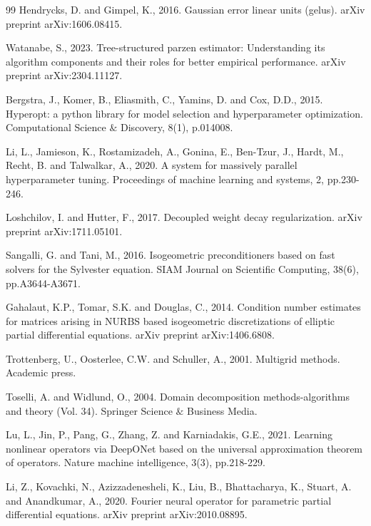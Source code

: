 \documentclass{article}
\theoremstyle{plain}
\numberwithin{equation}{section}
\begin{document}
\begin{thebibliography}{99}
    Hendrycks, D. and Gimpel, K., 2016. Gaussian error linear units (gelus). arXiv preprint arXiv:1606.08415.

    Watanabe, S., 2023. Tree-structured parzen estimator: Understanding its algorithm components and their roles for better empirical performance. arXiv preprint arXiv:2304.11127.

    Bergstra, J., Komer, B., Eliasmith, C., Yamins, D. and Cox, D.D., 2015. Hyperopt: a python library for model selection and hyperparameter optimization. Computational Science $\&$ Discovery, 8(1), p.014008.

    Li, L., Jamieson, K., Rostamizadeh, A., Gonina, E., Ben-Tzur, J., Hardt, M., Recht, B. and Talwalkar, A., 2020. A system for massively parallel hyperparameter tuning. Proceedings of machine learning and systems, 2, pp.230-246.

    Loshchilov, I. and Hutter, F., 2017. Decoupled weight decay regularization. arXiv preprint arXiv:1711.05101.

    Sangalli, G. and Tani, M., 2016. Isogeometric preconditioners based on fast solvers for the Sylvester equation. SIAM Journal on Scientific Computing, 38(6), pp.A3644-A3671.

    Gahalaut, K.P., Tomar, S.K. and Douglas, C., 2014. Condition number estimates for matrices arising in NURBS based isogeometric discretizations of elliptic partial differential equations. arXiv preprint arXiv:1406.6808.

    Trottenberg, U., Oosterlee, C.W. and Schuller, A., 2001. Multigrid methods. Academic press.

    Toselli, A. and Widlund, O., 2004. Domain decomposition methods-algorithms and theory (Vol. 34). Springer Science $\&$ Business Media.

    Lu, L., Jin, P., Pang, G., Zhang, Z. and Karniadakis, G.E., 2021. Learning nonlinear operators via DeepONet based on the universal approximation theorem of operators. Nature machine intelligence, 3(3), pp.218-229.

    Li, Z., Kovachki, N., Azizzadenesheli, K., Liu, B., Bhattacharya, K., Stuart, A. and Anandkumar, A., 2020. Fourier neural operator for parametric partial differential equations. arXiv preprint arXiv:2010.08895.


\end{thebibliography}
\end{document}
